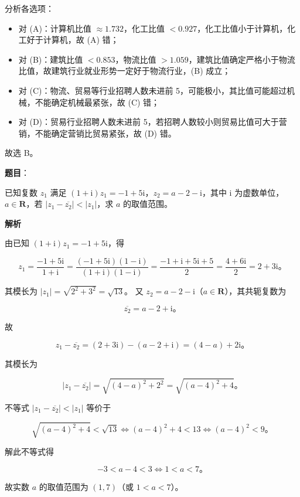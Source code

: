 \begin{answer}
分析各选项：
\begin{itemize}
\item 对 (A)：计算机比值 $\approx 1.732$，化工比值 $< 0.927$，化工比值小于计算机，化工好于计算机，故 (A) 错；
\item 对 (B)：建筑比值 $< 0.853$，物流比值 $> 1.059$，建筑比值确定严格小于物流比值，故建筑行业就业形势一定好于物流行业，(B) 成立；
\item 对 (C)：物流、贸易等行业招聘人数未进前 5，可能极小，其比值可能超过机械，不能确定机械最紧张，故 (C) 错；
\item 对 (D)：贸易行业招聘人数未进前 5，若招聘人数较小则贸易比值可大于营销，不能确定营销比贸易紧张，故 (D) 错。
\end{itemize}

故选 B。


\end{answer}
\begin{answer}

\textbf{题目}：

已知复数 $z_1$ 满足 $(1 + \mathrm{i})z_1 = -1 + 5\mathrm{i}$，$z_2 = a - 2 - \mathrm{i}$，其中 $\mathrm{i}$ 为虚数单位，$a \in \mathbf{R}$，若 $|z_1 - \overline{z_2}| < |z_1|$，求 $a$ 的取值范围。

\textbf{解析}

由已知 $(1 + \mathrm{i})z_1 = -1 + 5\mathrm{i}$，得

\nopagebreak[4]
\[
z_1 = \dfrac{-1 + 5\mathrm{i}}{1 + \mathrm{i}} = \dfrac{(-1 + 5\mathrm{i})(1 - \mathrm{i})}{(1 + \mathrm{i})(1 - \mathrm{i})} = \dfrac{-1 + \mathrm{i} + 5\mathrm{i} + 5}{2} = \dfrac{4 + 6\mathrm{i}}{2} = 2 + 3\mathrm{i}\mbox{。}
\]

其模长为 $|z_1| = \sqrt{2^2 + 3^2} = \sqrt{13}$。
又 $z_2 = a - 2 - \mathrm{i}$（$a \in \mathbf{R}$），其共轭复数为

\nopagebreak[4]
\[
\overline{z_2} = a - 2 + \mathrm{i}\mbox{。}
\]

故

\nopagebreak[4]
\[
z_1 - \overline{z_2} = (2 + 3\mathrm{i}) - (a - 2 + \mathrm{i}) = (4 - a) + 2\mathrm{i}\mbox{。}
\]

其模长为

\nopagebreak[4]
\[
|z_1 - \overline{z_2}| = \sqrt{(4 - a)^2 + 2^2} = \sqrt{(a - 4)^2 + 4}\mbox{。}
\]

不等式 $|z_1 - \overline{z_2}| < |z_1|$ 等价于

\nopagebreak[4]
\[
\sqrt{(a - 4)^2 + 4} < \sqrt{13} \iff (a - 4)^2 + 4 < 13 \iff (a - 4)^2 < 9\mbox{。}
\]

解此不等式得

\nopagebreak[4]
\[
-3 < a - 4 < 3 \iff 1 < a < 7\mbox{。}
\]

故实数 $a$ 的取值范围为 $(1, 7)$（或 $1 < a < 7$）。


\end{answer}

